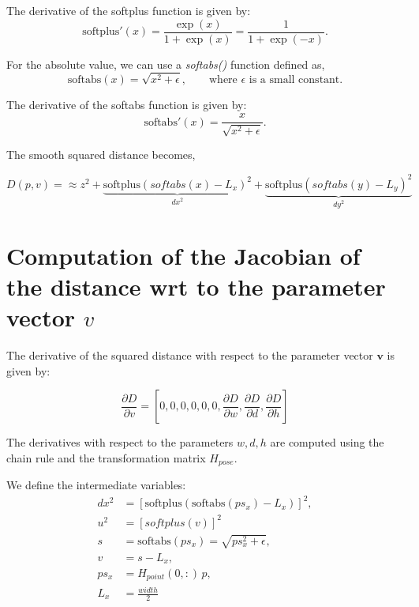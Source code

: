\documentclass[11pt]{article}
\begin{document}
        The derivative of the softplus function is given by:
        \begin{equation}
            \text{softplus}'(x) = \frac{\exp(x)}{1+\exp(x)} = \frac{1}{1+\exp(-x)}.
        \end{equation}

        For the absolute value, we can use a \textit{softabs()} function defined as,
        \begin{equation}
            \text{softabs}(x) = \sqrt{x^2 + \epsilon}, \qquad \text{where } \epsilon \text{ is a small constant}.
        \end{equation}

        The derivative of the softabs function is given by:
        \begin{equation}
            \text{softabs}'(x) = \frac{x}{\sqrt{x^2 + \epsilon}}.
        \end{equation}


        The smooth squared distance becomes,

        \begin{equation}
            \boxed{D(p,v) = \approx z^2 + \underbrace{\text{softplus}(softabs(x) - L_x)^2}_{dx^2} + \underbrace{\text{softplus}(softabs(y) - L_y)^2}_{dy^2}}
        \end{equation}




\section*{Computation of the Jacobian of the distance wrt to the parameter vector $v$}

        The derivative of the squared distance with respect to the parameter vector \(\mathbf{v}\) is given by:

        \begin{equation}
            \frac{\partial D}{\partial v} = \left[0,0,0,0,0,0, \frac{\partial D}{\partial w}, \frac{\partial D}{\partial d}, \frac{\partial D}{\partial h}\right]
        \end{equation}

        The derivatives with respect to the parameters $w,d,h$ are computed using the chain rule and the transformation matrix \(H_{pose}\).

        We define the intermediate variables:
        \begin{align}
            dx^2 &= \left[\text{softplus}(\text{softabs}(ps_x) - L_x)\right]^2,\\
            u^2 &= [softplus(v)]^2 \\
            s &= \text{softabs}(ps_{x}) = \sqrt{ps_{x}^2 + \epsilon}, \\
            v &= s - L_x, \\
            ps_{x} &= H_{point}(0,:)\, p, \\
            L_x &= \frac{width}{2} \\
        \end{align}
\end{document}
